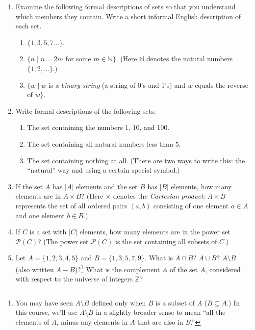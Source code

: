 \documentclass{../homework}
\begin{document}
\begin{enumerate}
    \item Examine the following formal descriptions of sets so that you understand which members they contain. Write a short informal English description of each set.
        \begin{enumerate}
            \item $\{1, 3, 5, 7...\}$.
            
            \item $\{n \; | \; n = 2m$ for some $m \in \mathbb{N}\}$. (Here $\mathbb{N}$ denotes the natural numbers $\{1, 2, \dots\}$.) 
            
            \item $\{w \; | \; w$ is a \emph{binary string} (a string of 0's and 1's) and $w$ equals the reverse of $w\}$.

        \end{enumerate}
    \item Write formal descriptions of the following sets.
        \begin{enumerate}
            \item The set containing the numbers 1, 10, and 100.
            
            \item The set containing all natural numbers less than 5.
            
            \item The set containing nothing at all. (There are two ways to write this: the ``natural'' way and using a certain special symbol.)
            
        \end{enumerate}
    \item If the set $A$ has $|A|$ elements and the set $B$ has $|B|$ elements, how many elements are in $A \times B$? (Here $\times$ denotes the \emph{Cartesian product}: $A \times B$ represents the set of all ordered pairs $(a, b)$ consisting of one element $a \in A$ and one element $b \in B$.)

    \item If $C$ is a set with $|C|$ elements, how many elements are in the power set $\mathcal{P}(C)$? (The power set $\mathcal{P}(C)$ is the set containing all subsets of $C$.)

    \item Let $A = \{1, 2, 3, 4, 5\}$ and $B = \{1, 3, 5, 7, 9\}$. What is $A \cap B$? $A \cup B?$ $A \setminus B$ (also written $A - B$)?\footnote{You may have seen $A \setminus B$ defined only when $B$ is a subset of $A$ ($B \subseteq A$.) In this course, we'll use $A \setminus B$ in a slightly broader sense to mean ``all the elements of $A$, minus any elements in $A$ that are also in $B$.''} What is the complement $\overline{A}$ of the set $A$, considered with respect to the universe of integers $\mathbb{Z}$?


\end{enumerate}
\end{document}
